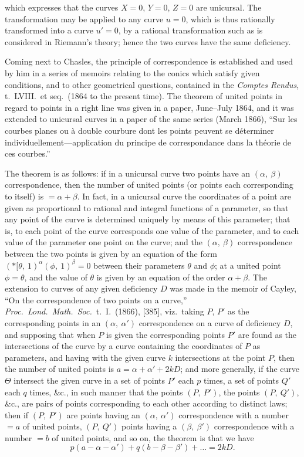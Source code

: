 \documentclass[12pt,a4paper,oneside]{book}
\begin{document}
\newpage
which expresses that the curves $X=0$, $Y=0$, $Z=0$ are unicursal. The transformation may be applied to any curve $u=0$, which is thus rationally transformed into a curve $u'=0$, by a rational transformation such as is considered in Riemann's theory; hence the two curves have the same deficiency.

Coming next to Chasles, the principle of correspondence is established and used by him in a series of memoirs relating to the conics which satisfy given conditions, and to other geometrical questions, contained in the \textit{Comptes Rendus}, t.~LVIII.\ et seq.\ (1864 to the present time). The theorem of united points in regard to points in a right line was given in a paper, June--July 1864, and it was extended to unicursal curves in a paper of the same series (March 1866), ``Sur les courbes planes ou \`a double courbure dont les points peuvent se d\'eterminer individuellement---application du principe de correspondance dans la th\'eorie de ces courbes.''

The theorem is as follows: if in a unicursal curve two points have an $(\alpha,\ \beta)$ correspondence, then the number of united points (or points each corresponding to itself) is $=\alpha+\beta$. In fact, in a unicursal curve the coordinates of a point are given as proportional to rational and integral functions of a parameter, so that any point of the curve is determined uniquely by means of this parameter; that is, to each point of the curve corresponds one value of the parameter, and to each value of the parameter one point on the curve; and the $(\alpha,\ \beta)$ correspondence between the two points is given by an equation of the form $(*\!\![\theta,\ 1)^{\alpha}(\phi,\ 1)^{\beta}=0$ between their parameters $\theta$ and $\phi$; at a united point $\phi=\theta$, and the value of $\theta$ is given by an equation of the order $\alpha+\beta$. The extension to curves of any given deficiency $D$ was made in the memoir of Cayley, ``On the correspondence of two points on a curve,'' \textit{Proc.\ Lond.\ Math.\ Soc.}\ t.~I.\ (1866), [385], viz.\ taking $P$, $P'$ as the corresponding points in an $(\alpha,\ \alpha')$ correspondence on a curve of deficiency $D$, and supposing that when $P$ is given the corresponding points $P'$ are found as the intersections of the curve by a curve containing the coordinates of $P$ as parameters, and having with the given curve $k$ intersections at the point $P$, then the number of united points is $a=\alpha+\alpha'+2kD$; and more generally, if the curve $\Theta$ intersect the given curve in a set of points $P'$ each $p$ times, a set of points $Q'$ each $q$ times, \&c., in such manner that the points $(P,\ P')$, the points $(P,\ Q')$, \&c., are pairs of points corresponding to each other according to distinct laws; then if $(P,\ P')$ are points having an $(\alpha,\ \alpha')$ correspondence with a number $=a$ of united points, $(P,\ Q')$ points having a $(\beta,\ \beta')$ correspondence with a number $=b$ of united points, and so on, the theorem is that we have
\[
p(a-\alpha-\alpha')+q(b-\beta-\beta')+\dots=2kD.
\]
\end{document}
